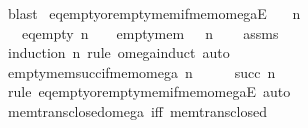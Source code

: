 \begin{isabellebody}
\ blast%
\endisatagproof
{\isafoldproof}%
%
\isadelimproof
\isanewline
%
\endisadelimproof
\isanewline
{}\isamarkupfalse%
\ eq{\isacharunderscore}{\kern0pt}empty{\isacharunderscore}{\kern0pt}or{\isacharunderscore}{\kern0pt}empty{\isacharunderscore}{\kern0pt}mem{\isacharunderscore}{\kern0pt}if{\isacharunderscore}{\kern0pt}mem{\isacharunderscore}{\kern0pt}omegaE{\isacharcolon}{\kern0pt}\isanewline
\ \ \ {\isachardoublequoteopen}n\ {\isasymin}\ {\isasymomega}{\isachardoublequoteclose}\isanewline
\ \ \ {\isacharparenleft}{\kern0pt}eq{\isacharunderscore}{\kern0pt}empty{\isacharparenright}{\kern0pt}\ {\isachardoublequoteopen}n\ {\isacharequal}{\kern0pt}\ {\isacharbraceleft}{\kern0pt}{\isacharbraceright}{\kern0pt}{\isachardoublequoteclose}\ {\isacharbar}{\kern0pt}\ {\isacharparenleft}{\kern0pt}empty{\isacharunderscore}{\kern0pt}mem{\isacharparenright}{\kern0pt}\ {\isachardoublequoteopen}{\isacharbraceleft}{\kern0pt}{\isacharbraceright}{\kern0pt}\ {\isasymin}\ n{\isachardoublequoteclose}\isanewline
%
\isadelimproof
\ \ %
\endisadelimproof
%
\isatagproof
{}\isamarkupfalse%
\ assms\ \isamarkupfalse%
\ {\isacharparenleft}{\kern0pt}induction\ n\ rule{\isacharcolon}{\kern0pt}\ omega{\isacharunderscore}{\kern0pt}induct{\isacharparenright}{\kern0pt}\ auto%
\endisatagproof
{\isafoldproof}%
%
\isadelimproof
\isanewline
%
\endisadelimproof
\isanewline
{}\isamarkupfalse%
\ empty{\isacharunderscore}{\kern0pt}mem{\isacharunderscore}{\kern0pt}succ{\isacharunderscore}{\kern0pt}if{\isacharunderscore}{\kern0pt}mem{\isacharunderscore}{\kern0pt}omega{\isacharcolon}{\kern0pt}\ {\isachardoublequoteopen}n\ {\isasymin}\ {\isasymomega}\ {\isasymLongrightarrow}\ {\isacharbraceleft}{\kern0pt}{\isacharbraceright}{\kern0pt}\ {\isasymin}\ succ\ n{\isachardoublequoteclose}\isanewline
%
\isadelimproof
\ \ %
\endisadelimproof
%
\isatagproof
{}\isamarkupfalse%
\ {\isacharparenleft}{\kern0pt}rule\ eq{\isacharunderscore}{\kern0pt}empty{\isacharunderscore}{\kern0pt}or{\isacharunderscore}{\kern0pt}empty{\isacharunderscore}{\kern0pt}mem{\isacharunderscore}{\kern0pt}if{\isacharunderscore}{\kern0pt}mem{\isacharunderscore}{\kern0pt}omegaE{\isacharparenright}{\kern0pt}\ auto%
\endisatagproof
{\isafoldproof}%
%
\isadelimproof
\isanewline
%
\endisadelimproof
\isanewline
{}\isamarkupfalse%
\ mem{\isacharunderscore}{\kern0pt}trans{\isacharunderscore}{\kern0pt}closed{\isacharunderscore}{\kern0pt}omega\ {\isacharbrackleft}{\kern0pt}iff{\isacharbrackright}{\kern0pt}{\isacharcolon}{\kern0pt}\ {\isachardoublequoteopen}mem{\isacharunderscore}{\kern0pt}trans{\isacharunderscore}{\kern0pt}closed\ {\isasymomega}{\isachardoublequoteclose}\isanewline

\end{isabellebody}
